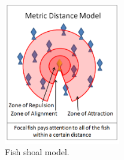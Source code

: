 \begin{figure}
\centering
\includegraphics[width=0.45\textwidth]{figs/swarmfig.png}
\caption{\label{fig:swarm} Fish shoal model.}
\end{figure}

